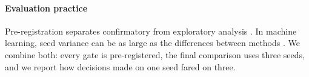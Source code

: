 \paragraph{Evaluation practice}
Pre-registration separates confirmatory from exploratory analysis \citep{nosek2018prereg}. In machine learning, seed variance can be as large as the differences between methods \citep{bouthillier2021variance}. We combine both: every gate is pre-registered, the final comparison uses three seeds, and we report how decisions made on one seed fared on three.

